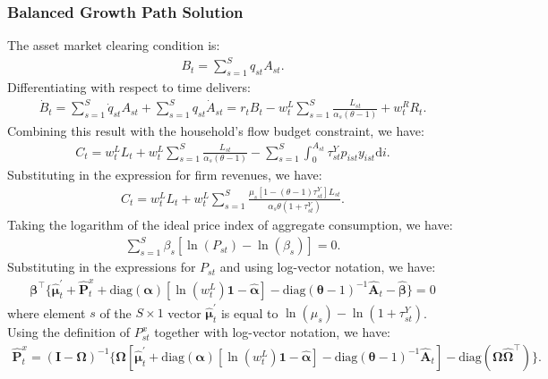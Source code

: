 \documentclass[12pt]{article}
\begin{document}
\subsubsection{Balanced Growth Path Solution}
\label{appendix:BGP solution}

The asset market clearing condition is:
\begin{align*}
B_t = \sum_{s = 1}^S q_{st} A_{st}.
\end{align*}
Differentiating with respect to time delivers:
\begin{align*}
\dot{B}_t = \sum_{s = 1}^S \dot{q}_{st} A_{st} + \sum_{s = 1}^S q_{st} \dot{A}_{st} = r_t B_t - w_t^L \sum_{s = 1}^S \frac{L_{st}}{\alpha_s (\theta - 1)} + w_t^R R_t.
\end{align*}
Combining this result with the household's flow budget constraint, we have:
\begin{align*}
C_t = w_t^L L_t + w_t^L \sum_{s = 1}^S \frac{L_{st}}{\alpha_s (\theta - 1)}  - \sum_{s = 1}^S \int_0^{A_{st}} \tau_{st}^Y p_{ist} y_{ist} \text{d}i.
\end{align*}
Substituting in the expression for firm revenues, we have:
\begin{align*}
C_t = w_t^L L_t + w_t^L \sum_{s = 1}^S \frac{\mu_s [1 - (\theta - 1) \tau_{st}^Y] L_{st}}{\alpha_s \theta (1 + \tau_{st}^Y)}.
\end{align*}
Taking the logarithm of the ideal price index of aggregate consumption, we have:
\begin{align*}
\sum_{s = 1}^S \beta_s [\ln(P_{st}) - \ln(\beta_s)] = 0.
\end{align*}
Substituting in the expressions for $P_{st}$ and using log-vector notation, we have:
\begin{align*}
\bm{\beta}^{\top} \{\hat{\bm{\mu}}_t^{\prime} + \hat{\mathbf{P}}_t^x + \text{diag}(\bm{\alpha}) [\ln(w_t^L) \mathbf{1} - \hat{\bm{\alpha}}] - \text{diag}(\bm{\theta} - 1)^{-1} \hat{\mathbf{A}}_t - \hat{\bm{\beta}}\} = 0
\end{align*}
where element $s$ of the $S \times 1$ vector $\hat{\bm{\mu}}_t^{\prime}$ is equal to $\ln(\mu_s) - \ln(1 + \tau_{st}^Y)$. Using the definition of $P_{st}^x$ together with log-vector notation, we have:
\begin{align*}
\hat{\mathbf{P}}_t^x = (\mathbf{I} - \bm{\Omega})^{-1} \{\bm{\Omega} [\hat{\bm{\mu}}_t^{\prime} + \text{diag}(\bm{\alpha}) [\ln(w_t^L) \mathbf{1} - \hat{\bm{\alpha}}] - \text{diag}(\bm{\theta} - 1)^{-1} \hat{\mathbf{A}}_t] - \text{diag}(\bm{\Omega} \hat{\bm{\Omega}}^{\top})\}.
\end{align*}
\end{document}
